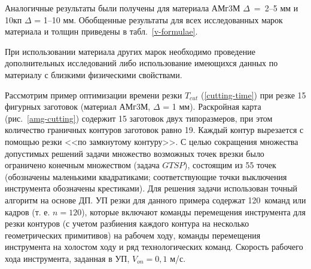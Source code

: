 Аналогичные результаты были получены для материала
АМг3М $\Delta$~=~2--5 мм
и 10кп $\Delta$ = 1--10 мм.
Обобщенные результаты для всех исследованных марок материала и толщин
приведены в табл.~\ref{v-formulae}.

При использовании материала других марок
необходимо проведение дополнительных исследований
либо использование имеющихся данных по материалу
с близкими физическими свойствами.

Рассмотрим пример оптимизации времени резки
$T_{cut}$
(\ref{cutting-time})
при резке 15 фигурных заготовок
(материал АМг3М, $\Delta$ = 1 мм).
Раскройная карта
(рис.~\ref{amg-cutting})
содержит 15 заготовок двух типоразмеров,
при этом количество граничных контуров заготовок равно 19.
Каждый контур вырезается с помощью резки
<<по замкнутому контуру>>.
С целью сокращения множества допустимых решений
задачи множество возможных точек врезки было
ограничено конечным множеством
(задача $GTSP$),
состоящим из 55 точек
(обозначены маленькими квадратиками;
соответствующие точки выключения инструмента обозначены крестиками).
Для решения задачи использован точный алгоритм на основе ДП.
УП резки для данного примера содержат 120~команд или кадров
(т. е. $n=120$),
которые включают команды перемещения инструмента
для резки контуров
(с учетом разбиения каждого контура на несколько геометрических примитивов)
на рабочем ходу,
команды перемещения инструмента на холостом ходу
и ряд технологических команд.
Скорость рабочего хода инструмента, заданная в УП,
$V_{on}=0,1$ м/с.


